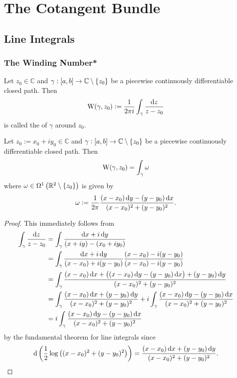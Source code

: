 \chapter{The Cotangent Bundle}
\section{Line Integrals}
\subsection{The Winding Number*}
\begin{definition}
Let $z_0 \in \mathbb{C}$ and $\gamma: \intcc{a,b} \to \mathbb{C} \setminus \cbr[0]{z_0}$ be a piecewise continuously differentiable closed path. Then
\begin{equation}
\mathrm{W}(\gamma,z_0) := \frac{1}{2\pi i} \int_\gamma \frac{\mathop{}\!\mathrm{d} z}{z - z_0}
\end{equation}
\noindent is called the  of $\gamma$ around $z_0$.
\label{def:winding_number}
\end{definition}

\begin{proposition}
Let $z_0 := x_0 + iy_0 \in \mathbb{C}$ and $\gamma: \intcc{a,b} \to \mathbb{C} \setminus \cbr[0]{z_0}$ be a piecewise continuously differentiable closed path. Then 
\begin{equation}
\mathrm{W}(\gamma,z_0) = \int_\gamma \omega
\end{equation}
\noindent where $\omega \in \Omega^1\del[1]{\mathbb{R}^2 \setminus \cbr[0]{z_0}}$ is given by
\begin{equation}
\omega := \frac{1}{2\pi}\frac{(x - x_0)\mathop{}\!\mathrm{d} y - (y - y_0) \mathop{}\!\mathrm{d} x}{(x - x_0)^2 + (y - y_0)^2}.
\end{equation}
\label{prop:winding_number_equivalence}
\end{proposition}

\begin{proof}
This immediately follows from 
\begin{align*}
\int_\gamma \frac{\d z}{z - z_0} &= \int_\gamma \frac{\d x + i \d y}{(x + iy) - (x_0 + iy_0)}\\
&= \int_\gamma \frac{\d x + i \d y}{(x - x_0) + i(y - y_0)}\frac{(x - x_0) - i(y - y_0)}{(x - x_0) - i(y - y_0)}\\
&= \int_\gamma \frac{(x - x_0)\d x + \del[1]{(x - x_0)\d y - (y - y_0)\d x} + (y - y_0)\d y}{(x - x_0)^2 + (y - y_0)^2}\\
&= \int_\gamma \frac{(x - x_0)\d x + (y - y_0)\d y}{(x - x_0)^2 + (y - y_0)^2} + i\int_\gamma \frac{(x - x_0)\d y - (y - y_0)\d x}{(x - x_0)^2 + (y - y_0)^2}\\
&= i\int_\gamma \frac{(x - x_0)\d y - (y - y_0)\d x}{(x - x_0)^2 + (y - y_0)^2}
\end{align*}
\noindent by the fundamental theorem for line integrals \cite[291]{lee:smooth_manifolds:2013} since 
\begin{equation*}
\d \del[3]{\frac{1}{2} \log\del[1]{(x - x_0)^2 + (y - y_0)^2}} = \frac{(x - x_0)\d x + (y - y_0)\d y}{(x - x_0)^2 + (y - y_0)^2}.
\end{equation*}
\end{proof}

